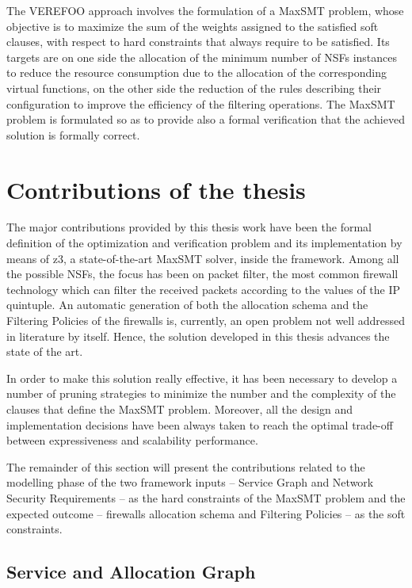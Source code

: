 \documentclass[10pt,a4paper,roman, twocolumn]{article}
\begin{document}
The VEREFOO approach involves the formulation of a MaxSMT problem, whose objective is to maximize the sum of the weights assigned to the satisfied soft clauses, with respect to hard constraints that always require to be satisfied. Its targets are on one side the allocation of the minimum number of NSFs instances to reduce the resource consumption due to the allocation of the corresponding virtual functions, on the other side the reduction of the rules describing their configuration to improve the efficiency of the filtering operations. The MaxSMT problem is formulated so as to provide also a formal verification that the achieved solution is formally correct.

\section{Contributions of the thesis}

The major contributions provided by this thesis work have been the formal definition of the optimization and verification problem and its implementation by means of z3, a state-of-the-art MaxSMT solver, inside the framework. Among all the possible NSFs, the focus has been on packet filter, the most common firewall technology which can filter the received packets according to the values of the IP quintuple. An automatic generation of both the allocation schema and the Filtering Policies of the firewalls is, currently, an open problem not well addressed in literature by itself. Hence, the solution developed in this thesis advances the state of the art.

In order to make this solution really effective, it has been necessary to develop a number of pruning strategies to minimize the number and the complexity of the clauses that define the MaxSMT problem. Moreover, all the design and implementation decisions have been always taken to reach the optimal trade-off between expressiveness and scalability performance.

The remainder of this section will present the contributions related to the modelling phase of the two framework inputs -- Service Graph and Network Security Requirements -- as the hard constraints of the MaxSMT problem and the expected outcome -- firewalls allocation schema and Filtering Policies -- as the soft constraints. 

\subsection{Service and Allocation Graph}
\end{document}

